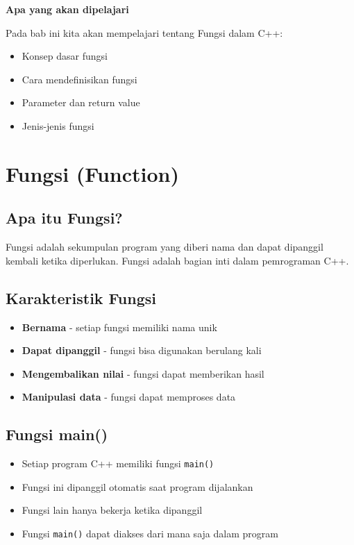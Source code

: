 \textbf{Apa yang akan dipelajari}

Pada bab ini kita akan mempelajari tentang Fungsi dalam C++:

\begin{itemize}
\item Konsep dasar fungsi
\item Cara mendefinisikan fungsi
\item Parameter dan return value
\item Jenis-jenis fungsi
\end{itemize}

\minitoc

\section{Fungsi (Function)}\label{sec-fungsi}

\subsection{Apa itu Fungsi?}

Fungsi adalah sekumpulan program yang diberi nama dan dapat dipanggil kembali ketika diperlukan. Fungsi adalah bagian inti dalam pemrograman C++.

\subsection{Karakteristik Fungsi}

\begin{itemize}
\item \textbf{Bernama} - setiap fungsi memiliki nama unik
\item \textbf{Dapat dipanggil} - fungsi bisa digunakan berulang kali
\item \textbf{Mengembalikan nilai} - fungsi dapat memberikan hasil
\item \textbf{Manipulasi data} - fungsi dapat memproses data
\end{itemize}

\subsection{Fungsi main()}

\begin{itemize}
\item Setiap program C++ memiliki fungsi \texttt{main()}
\item Fungsi ini dipanggil otomatis saat program dijalankan
\item Fungsi lain hanya bekerja ketika dipanggil
\item Fungsi \texttt{main()} dapat diakses dari mana saja dalam program
\end{itemize}

